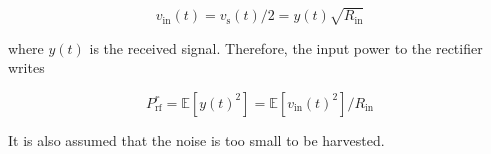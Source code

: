 \begin{equation}\label{eqn:rectifier_input_voltage}
  {v_{{\text{in}}}}(t) = {v_{\text{s}}}(t)/2 = y(t)\sqrt {{R_{{\text{in}}}}}
\end{equation}

where ${y(t)}$ is the received signal. Therefore, the input power to the rectifier writes

\begin{equation}\label{eqn:rectifier_input_power}
  P_{{\text{rf}}}^r = \mathbb{E}\left[ {y{{(t)}^2}} \right] = \mathbb{E}\left[ {{v_{{\text{in}}}}{{(t)}^2}} \right]/{R_{{\text{in}}}}
\end{equation}

It is also assumed that the noise is too small to be harvested.

